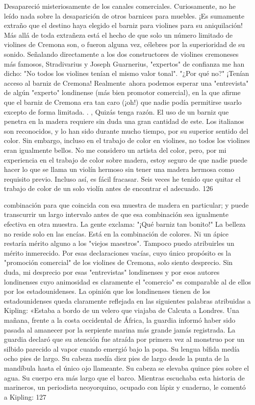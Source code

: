Desapareció misteriosamente de los canales comerciales. Curiosamente, no he leído nada sobre la desaparición de otros barnices para muebles. ¡Es sumamente extraño que el destino haya elegido el barniz para violines para su aniquilación! Más allá de toda extrañeza está el hecho de que solo un número limitado de violines de Cremona son, o fueron alguna vez, célebres por la superioridad de su sonido. Señalando directamente a los dos constructores de violines cremoneses más famosos, Stradivarius y Joseph Guarnerius, "expertos" de confianza me han dicho: "No todos los violines tenían el mismo valor tonal".
"¿Por qué no?"
¡Tenían acceso al barniz de Cremona!
Realmente~ahora podemos esperar una "entrevista" de algún "experto" londinense (más bien promotor comercial), en la que afirme que el barniz de Cremona era tan caro (¡oh!) que nadie podía permitirse usarlo excepto de forma limitada. . ,
Quizás tenga razón.
El uso de un barniz que penetra en la madera requiere sin duda una gran cantidad de este.
Los italianos son reconocidos, y lo han sido durante mucho tiempo, por su superior sentido del color. Sin embargo, incluso en el trabajo de color en violines, no todos los violines eran igualmente bellos. No me considero un artista del color, pero, por mi experiencia en el trabajo de color sobre madera, estoy seguro de que nadie puede hacer lo que se llama un violín hermoso sin tener una madera hermosa como requisito previo. Incluso así, es fácil fracasar. Seis veces he tenido que quitar el trabajo de color de un solo violín antes de encontrar el adecuado.
126

combinación para que coincida con esa muestra de madera en particular; y puede transcurrir un largo intervalo antes de que esa combinación sea igualmente efectiva en otra muestra. La gente exclama: "¡Qué barniz tan bonito!"
La belleza no reside solo en las encías. Está en la combinación de colores.
Ni un ápice restaría mérito alguno a los "viejos maestros". Tampoco puedo atribuirles un mérito inmerecido. Por esas declaraciones vacías, cuyo único propósito es la "promoción comercial" de los violines de Cremona, solo siento desprecio.
Sin duda, mi desprecio por esas "entrevistas" londinenses y por esos autores londinenses cuyo animosidad es claramente el "comercio" es comparable al de ellos por los estadounidenses. La opinión que los londinenses tienen de los estadounidenses queda claramente reflejada en las siguientes palabras atribuidas a Kipling: «Estaba a bordo de un velero que viajaba de Calcuta a Londres. Una mañana, frente a la costa occidental de África, la guardia informó haber sido pasada al amanecer por la serpiente marina más grande jamás registrada. La guardia declaró que su atención fue atraída por primera vez al monstruo por un silbido parecido al vapor cuando emergió bajo la popa. Su lengua bífida medía ocho pies de largo. Su cabeza medía diez pies de largo desde la punta de la mandíbula hasta el único ojo llameante. Su cabeza se elevaba quince pies sobre el agua. Su cuerpo era más largo que el barco. Mientras escuchaba esta historia de marineros, un periodista neoyorquino, ocupado con lápiz y cuaderno, le comentó a Kipling:
127

